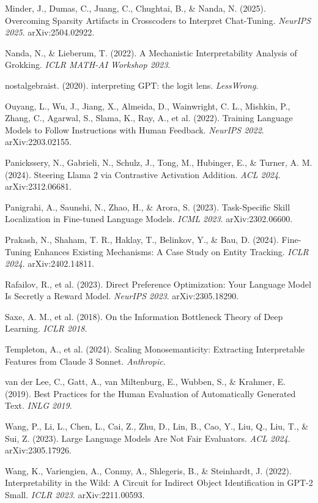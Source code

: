 \documentclass[11pt]{article}
\begin{document}
Minder, J., Dumas, C., Juang, C., Chughtai, B., \& Nanda, N. (2025). Overcoming Sparsity Artifacts in Crosscoders to Interpret Chat-Tuning. \emph{NeurIPS 2025}. arXiv:2504.02922.

Nanda, N., \& Lieberum, T. (2022). A Mechanistic Interpretability Analysis of Grokking. \emph{ICLR MATH-AI Workshop 2023}.

nostalgebraist. (2020). interpreting GPT: the logit lens. \emph{LessWrong}.

Ouyang, L., Wu, J., Jiang, X., Almeida, D., Wainwright, C. L., Mishkin, P., Zhang, C., Agarwal, S., Slama, K., Ray, A., et al. (2022). Training Language Models to Follow Instructions with Human Feedback. \emph{NeurIPS 2022}. arXiv:2203.02155.

Panickssery, N., Gabrieli, N., Schulz, J., Tong, M., Hubinger, E., \& Turner, A. M. (2024). Steering Llama 2 via Contrastive Activation Addition. \emph{ACL 2024}. arXiv:2312.06681.

Panigrahi, A., Saunshi, N., Zhao, H., \& Arora, S. (2023). Task-Specific Skill Localization in Fine-tuned Language Models. \emph{ICML 2023}. arXiv:2302.06600.

Prakash, N., Shaham, T. R., Haklay, T., Belinkov, Y., \& Bau, D. (2024). Fine-Tuning Enhances Existing Mechanisms: A Case Study on Entity Tracking. \emph{ICLR 2024}. arXiv:2402.14811.

Rafailov, R., et al. (2023). Direct Preference Optimization: Your Language Model Is Secretly a Reward Model. \emph{NeurIPS 2023}. arXiv:2305.18290.

Saxe, A. M., et al. (2018). On the Information Bottleneck Theory of Deep Learning. \emph{ICLR 2018}.

Templeton, A., et al. (2024). Scaling Monosemanticity: Extracting Interpretable Features from Claude 3 Sonnet. \emph{Anthropic}.

van der Lee, C., Gatt, A., van Miltenburg, E., Wubben, S., \& Krahmer, E. (2019). Best Practices for the Human Evaluation of Automatically Generated Text. \emph{INLG 2019}.

Wang, P., Li, L., Chen, L., Cai, Z., Zhu, D., Lin, B., Cao, Y., Liu, Q., Liu, T., \& Sui, Z. (2023). Large Language Models Are Not Fair Evaluators. \emph{ACL 2024}. arXiv:2305.17926.

Wang, K., Variengien, A., Conmy, A., Shlegeris, B., \& Steinhardt, J. (2022). Interpretability in the Wild: A Circuit for Indirect Object Identification in GPT-2 Small. \emph{ICLR 2023}. arXiv:2211.00593.
\end{document}
